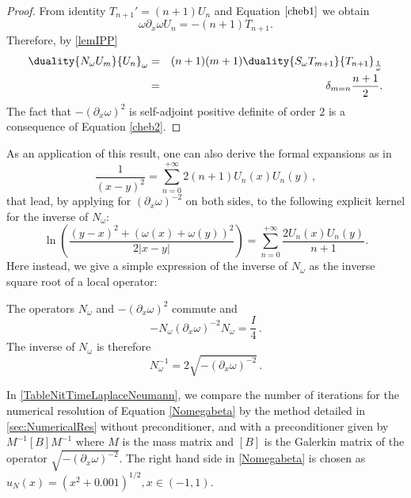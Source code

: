 \documentclass[a4paper]{article}
\begin{document}
	\begin{proof}
		From identity $T_{n+1}' = (n+1)U_n$ and Equation $\eqref{cheb1}$ we obtain
		\begin{equation*}
		\omega \partial_x \omega U_n = -(n+1) T_{n+1}.
		\end{equation*}
		Therefore, by \autoref{lemIPP}
		\begin{eqnarray*}
			\duality{N_\omega U_m}{U_n}_\omega & = & (n+1)(m+1)\duality{S_\omega T_{m+1}}{T_{n+1}}_\frac{1}{\omega}\\
			&=& \delta_{m=n} \frac{n+1}{2}.	
		\end{eqnarray*}
		The fact that $-(\partial_x \omega)^2$ is self-adjoint positive definite of order $2$ is a consequence of Equation \eqref{cheb2}.
	\end{proof}
	As an application of this result, one can also derive the formal expansions as in \cite{jerez2012explicit}
	\[\frac{1}{(x-y)^2} = \sum_{n=0}^{+\infty} 2(n+1)U_n(x)U_n(y)\,,\]
	that lead, by applying for $(\partial_x\omega)^{-2}$ on both sides, to the following explicit kernel for the inverse of $N_\omega$:
	\[\ln\left(\dfrac{(y-x)^2 + (\omega(x) + \omega(y))^2}{2|x-y|}\right) = \sum_{n=0}^{+\infty} \dfrac{2 U_n(x) U_n(y)}{n+1}.\]
	Here instead, we give a simple expression of the inverse of $N_\omega$ as the inverse square root of a local operator:
	\begin{The} The operators $N_\omega$ and $-(\partial_x \omega)^2$ commute and 
		\[-N_\omega (\partial_x \omega)^{-2} N_{\omega} = \frac{I}{4}\,.\]
		The inverse of $N_\omega$ is therefore 
		\begin{equation}
		N_\omega^{-1} = 2\sqrt{-(\partial_x \omega)^{-2}}\,.
		\end{equation}
	\end{The}
	
	 In \autoref{TableNitTimeLaplaceNeumann}, we compare the number of iterations for the numerical resolution of Equation \eqref{Nomegabeta} by the method detailed in \autoref{sec:NumericalRes} without preconditioner, and with a preconditioner given by $M^{-1} \left[B \right] M^{-1}$ where $M$ is the mass matrix and $\left[ B \right]$ is the Galerkin matrix of the operator $\sqrt{ -( \partial_x \omega)^{-2}}$. The right hand side in \eqref{Nomegabeta} is chosen as $u_N(x) = (x^2 + 0.001)^{1/2}, x \in (-1,1)$.
\end{document}

